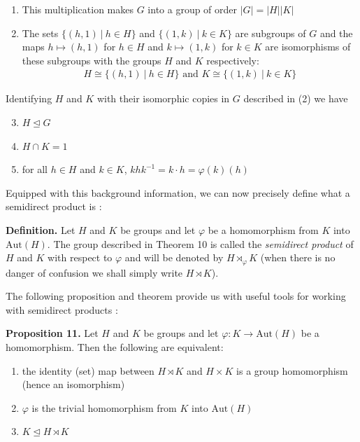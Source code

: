 \documentclass[11pt, reqno]{amsart}
\theoremstyle{plain}
\theoremstyle{definition}
\theoremstyle{example}
\def\normeq{\unlhd}
\begin{document}
\begin{enumerate}
\item This multiplication makes $G$ into a group of order $|G| = |H||K|$
\item The sets $\{(h, 1) \ | \ h \in H\}$ and $\{(1, k) \ | \ k \in K\}$ are subgroups of $G$ and the maps $h \mapsto (h, 1)$ for $h \in H$ and $k \mapsto (1, k)$ for $k \in K$ are isomorphisms of these subgroups with the groups $H$ and $K$ respectively:
\begin{align*}
H \cong \{(h, 1) \ | \ h \in H\} \text{  and  } K \cong \{(1, k) \ | \ k \in K \}
\end{align*}
\end{enumerate}

Identifying $H$ and $K$ with their isomorphic copies in $G$ described in (2) we have
\begin{enumerate}
\setcounter{enumi}{2}

\item $H \normeq G$
\item $H \cap K = 1$
\item for all $h \in H$ and $k \in K$, $khk^{-1} = k \cdot h = \varphi(k)(h)$
\end{enumerate}

Equipped with this background information, we can now precisely define what a semidirect product is \cite[\S 5.5, p. 177]{dummit}:

\par
\textbf{Definition.} Let $H$ and $K$ be groups and let $\varphi$ be a homomorphism from $K$ into $\text{Aut}(H)$. The group described in Theorem 10 is called the \textit{semidirect product} of $H$ and $K$ with respect to $\varphi$ and will be denoted by $H \rtimes_{\varphi} K$ (when there is no danger of confusion we shall simply write $H \rtimes K$).

\par
The following proposition and theorem provide us with useful tools for working with semidirect products \cite[\S 5.5, p. 177, 180]{dummit}:

\par
\textbf{Proposition 11.} Let $H$ and $K$ be groups and let $\varphi: K \to \text{Aut}(H)$ be a homomorphism. Then the following are equivalent:
\begin{enumerate}
\item the identity (set) map between $H \rtimes K$ and $H \times K$ is a group homomorphism (hence an isomorphism)
\item $\varphi$ is the trivial homomorphism from $K$ into $\text{Aut}(H)$
\item $K \normeq H \rtimes K$
\end{enumerate}
\end{document}
